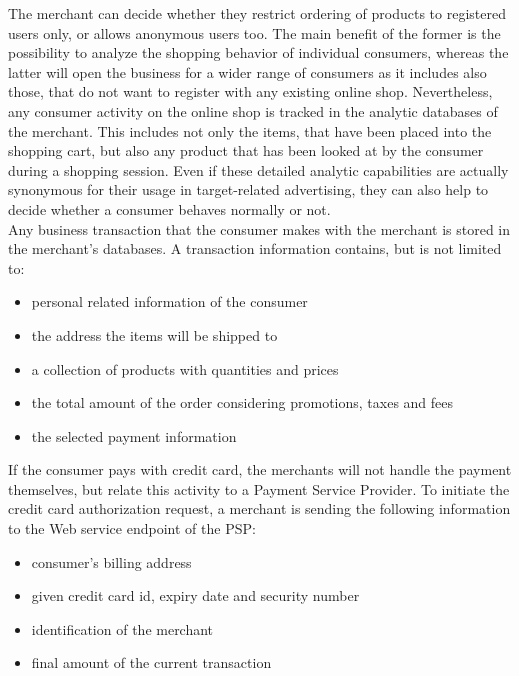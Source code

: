 The merchant can decide whether they restrict ordering of products to registered users only, or allows anonymous users too. The main benefit of the former is the possibility to analyze the shopping behavior of individual consumers, whereas the latter will open the business for a wider range of consumers as it includes also those, that do not want to register with any existing online shop. Nevertheless, any consumer activity on the online shop is tracked in the analytic databases of the merchant. This includes not only the items, that have been placed into the shopping cart, but also any product that has been looked at by the consumer during a shopping session. Even if these detailed analytic capabilities are actually synonymous for their usage in target-related advertising, they can also help to decide whether a consumer behaves normally or not. \\

Any business transaction that the consumer makes with the merchant is stored in the merchant's databases. A transaction information contains, but is not limited to:\@

\begin{itemize}
		\item personal related information of the consumer
		\item the address the items will be shipped to
		\item a collection of products with quantities and prices
		\item the total amount of the order considering promotions, taxes and fees
		\item the selected payment information
\end{itemize}

If the consumer pays with credit card, the merchants will not handle the payment themselves, but relate this activity to a Payment Service Provider. To initiate the credit card authorization request, a merchant is sending the following information to the Web service endpoint of the \gls{PSP}: \@

\begin{itemize}
    \item consumer's billing address
    \item given credit card id, expiry date and security number
    \item identification of the merchant
    \item final amount of the current transaction
\end{itemize}

